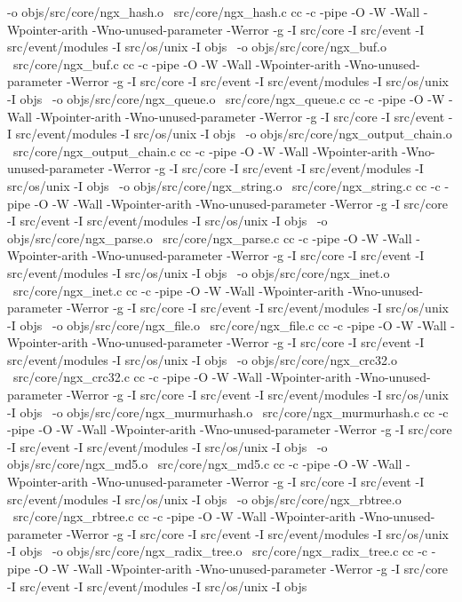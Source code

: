 	-o objs/src/core/ngx_hash.o \
	src/core/ngx_hash.c
cc -c -pipe  -O -W -Wall -Wpointer-arith -Wno-unused-parameter -Werror -g  -I src/core -I src/event -I src/event/modules -I src/os/unix -I objs \
	-o objs/src/core/ngx_buf.o \
	src/core/ngx_buf.c
cc -c -pipe  -O -W -Wall -Wpointer-arith -Wno-unused-parameter -Werror -g  -I src/core -I src/event -I src/event/modules -I src/os/unix -I objs \
	-o objs/src/core/ngx_queue.o \
	src/core/ngx_queue.c
cc -c -pipe  -O -W -Wall -Wpointer-arith -Wno-unused-parameter -Werror -g  -I src/core -I src/event -I src/event/modules -I src/os/unix -I objs \
	-o objs/src/core/ngx_output_chain.o \
	src/core/ngx_output_chain.c
cc -c -pipe  -O -W -Wall -Wpointer-arith -Wno-unused-parameter -Werror -g  -I src/core -I src/event -I src/event/modules -I src/os/unix -I objs \
	-o objs/src/core/ngx_string.o \
	src/core/ngx_string.c
cc -c -pipe  -O -W -Wall -Wpointer-arith -Wno-unused-parameter -Werror -g  -I src/core -I src/event -I src/event/modules -I src/os/unix -I objs \
	-o objs/src/core/ngx_parse.o \
	src/core/ngx_parse.c
cc -c -pipe  -O -W -Wall -Wpointer-arith -Wno-unused-parameter -Werror -g  -I src/core -I src/event -I src/event/modules -I src/os/unix -I objs \
	-o objs/src/core/ngx_inet.o \
	src/core/ngx_inet.c
cc -c -pipe  -O -W -Wall -Wpointer-arith -Wno-unused-parameter -Werror -g  -I src/core -I src/event -I src/event/modules -I src/os/unix -I objs \
	-o objs/src/core/ngx_file.o \
	src/core/ngx_file.c
cc -c -pipe  -O -W -Wall -Wpointer-arith -Wno-unused-parameter -Werror -g  -I src/core -I src/event -I src/event/modules -I src/os/unix -I objs \
	-o objs/src/core/ngx_crc32.o \
	src/core/ngx_crc32.c
cc -c -pipe  -O -W -Wall -Wpointer-arith -Wno-unused-parameter -Werror -g  -I src/core -I src/event -I src/event/modules -I src/os/unix -I objs \
	-o objs/src/core/ngx_murmurhash.o \
	src/core/ngx_murmurhash.c
cc -c -pipe  -O -W -Wall -Wpointer-arith -Wno-unused-parameter -Werror -g  -I src/core -I src/event -I src/event/modules -I src/os/unix -I objs \
	-o objs/src/core/ngx_md5.o \
	src/core/ngx_md5.c
cc -c -pipe  -O -W -Wall -Wpointer-arith -Wno-unused-parameter -Werror -g  -I src/core -I src/event -I src/event/modules -I src/os/unix -I objs \
	-o objs/src/core/ngx_rbtree.o \
	src/core/ngx_rbtree.c
cc -c -pipe  -O -W -Wall -Wpointer-arith -Wno-unused-parameter -Werror -g  -I src/core -I src/event -I src/event/modules -I src/os/unix -I objs \
	-o objs/src/core/ngx_radix_tree.o \
	src/core/ngx_radix_tree.c
cc -c -pipe  -O -W -Wall -Wpointer-arith -Wno-unused-parameter -Werror -g  -I src/core -I src/event -I src/event/modules -I src/os/unix -I objs \
